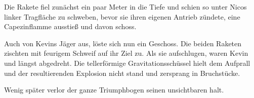 \par


\par

Die Rakete fiel zunächst ein paar Meter in die Tiefe und schien so unter Nicos linker Tragfläche zu schweben, bevor sie ihren eigenen Antrieb zündete, eine Capezinflamme ausstieß und davon schoss.

\par


\par

Auch von Kevins Jäger aus, löste sich nun ein Geschoss. Die beiden Raketen zischten mit feurigem Schweif auf ihr Ziel zu. Als sie aufschlugen, waren Kevin und längst abgedreht. Die tellerförmige Gravitationsschüssel hielt dem Aufprall und der resultierenden Explosion nicht stand und zersprang in Bruchstücke.

\par

Wenig später verlor der ganze Triumphbogen seinen unsichtbaren halt.
